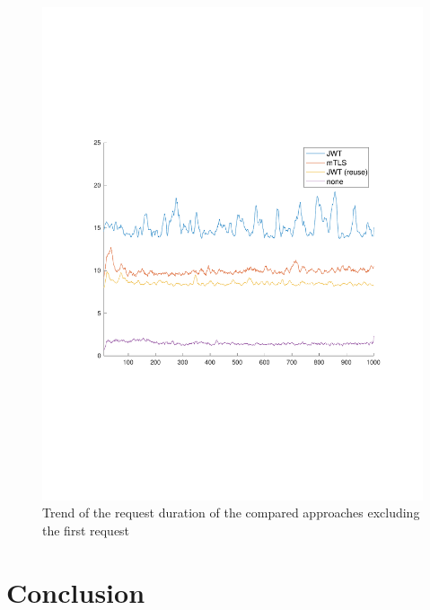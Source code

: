 \begin{figure}
	\centering
	\includegraphics[trim=0 200 0 200, clip, width=\textwidth]{images/experiment/experiment-trend.pdf}
	\caption{Trend of the request duration of the compared approaches excluding the first request}
	\label{fig:trend}
\end{figure}

\section{Conclusion}

